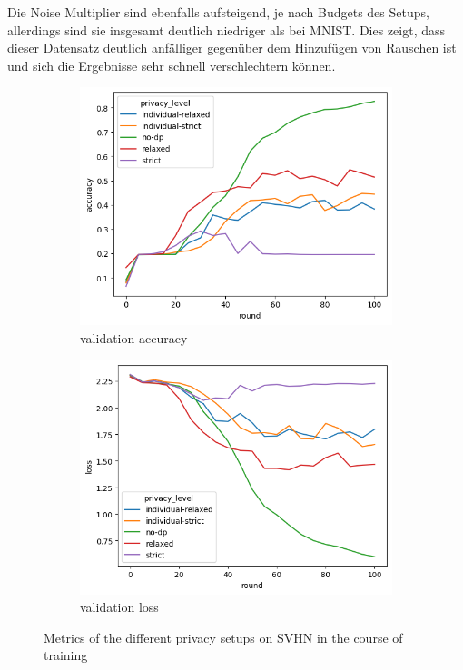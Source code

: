Die Noise Multiplier sind ebenfalls aufsteigend, je nach Budgets des Setups, allerdings sind sie insgesamt deutlich niedriger als bei MNIST. Dies zeigt, dass dieser Datensatz deutlich anfälliger gegenüber dem Hinzufügen von Rauschen ist und sich die Ergebnisse sehr schnell verschlechtern können.

\begin{figure}
	\centering
	\begin{subfigure}{0.4\textwidth}
		\centering
		\includegraphics[width=\textwidth]{Bilder/svhn-accuracy.png}
		\caption{validation accuracy}
	\end{subfigure}
	\begin{subfigure}{0.4\textwidth}
		\centering
		\includegraphics[width=\textwidth]{Bilder/svhn-loss.png}
		\caption{validation loss}
	\end{subfigure}
	\caption{Metrics of the different privacy setups on SVHN in the course of training}
	\label{fig:fed-svhn-results}
\end{figure}

